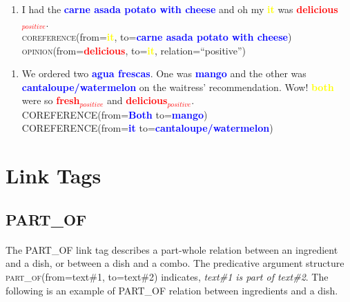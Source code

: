 \documentclass{article}
\begin{document}
\begin{enumerate}[resume]
	\item I had the \textbf{\textcolor{blue}{carne asada potato with cheese}} and oh my \textbf{\textcolor{yellow}{it}} was \textbf{\textcolor{red}{delicious$_{positive}$}}.\\
	\textsc{coreference}(from=\textbf{\textcolor{yellow}{it}}, to=\textbf{\textcolor{blue}{carne asada potato with cheese}})\\
		\textsc{opinion}(from=\textbf{\textcolor{red}{delicious}}, to=\textbf{\textcolor{yellow}{it}}, relation=``positive'')\\
\end{enumerate}

\begin{enumerate}[resume]
	\item We ordered two \textbf{\textcolor{blue}{agua frescas}}. One was  \textbf{\textcolor{blue}{mango}} and the other was 
	\textbf{\textcolor{blue}{cantaloupe/watermelon}} on the waitress' recommendation. Wow! 
	\textbf{\textcolor{yellow}{both}} were so 
	\textbf{\textcolor{red}{fresh$_{positive}$}} and 
	\textbf{\textcolor{red}{delicious$_{positive}$}}.\\
	
		\textsc{COREFERENCE}(from=\textbf{\textcolor{blue}{Both}} to=\textbf{\textcolor{blue}{mango}}) \\
		\textsc{COREFERENCE}(from=\textbf{\textcolor{blue}{it}} to=\textbf{\textcolor{blue}{cantaloupe/watermelon}}) \\
	
\end{enumerate}

\newpage
\section{Link Tags}


\subsection{PART\_OF}
\paragraph{}
The PART\_OF link tag describes a part-whole relation between an ingredient and a dish, or between a dish and a combo. The predicative argument structure \textsc{part\_of}(from=text\#1, to=text\#2) indicates, \textit{text\#1 is part of text\#2}. The following is an example of PART\_OF relation between ingredients and a dish.
\end{document}
